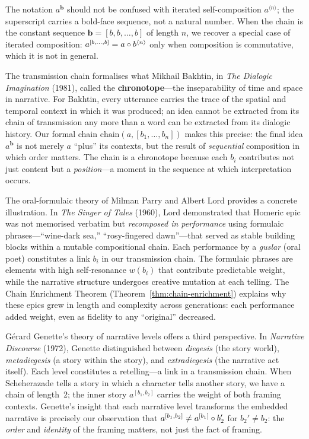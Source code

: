 \begin{remark}
The notation $a^{\mathbf{b}}$ should not be confused with iterated
self-composition $a^{\langle n \rangle}$; the superscript carries a bold-face
sequence, not a natural number.  When the chain is the constant sequence
$\mathbf{b} = [b, b, \ldots, b]$ of length $n$, we recover a special case of
iterated composition:
$a^{[b, \ldots, b]} = a \circ b^{\langle n \rangle}$ only when composition
is commutative, which it is not in general.
\end{remark}

\begin{interpretation}
\label{interp:ch8:bakhtin_chronotope}
The transmission chain formalises what Mikhail Bakhtin, in \emph{The Dialogic
Imagination} (1981), called the \textbf{chronotope}---the inseparability of
time and space in narrative.  For Bakhtin, every utterance carries the trace
of the spatial and temporal context in which it was produced; an idea cannot
be extracted from its chain of transmission any more than a word can be
extracted from its dialogic history.  Our formal chain
$\mathrm{chain}(a, [b_1, \ldots, b_n])$ makes this precise: the final idea
$a^{\mathbf{b}}$ is not merely $a$ ``plus'' its contexts, but the result of
\emph{sequential} composition in which order matters.  The chain is a
chronotope because each $b_i$ contributes not just content but a
\emph{position}---a moment in the sequence at which interpretation occurs.

The oral-formulaic theory of Milman Parry and Albert Lord provides a concrete
illustration.  In \emph{The Singer of Tales} (1960), Lord demonstrated that
Homeric epic was not memorised verbatim but \emph{recomposed in performance}
using formulaic phrases---``wine-dark sea,'' ``rosy-fingered dawn''---that
served as stable building blocks within a mutable compositional chain.  Each
performance by a \emph{guslar} (oral poet) constitutes a link $b_i$ in our
transmission chain.  The formulaic phrases are elements with high
self-resonance $w(b_i)$ that contribute predictable weight, while the
narrative structure undergoes creative mutation at each telling.  The Chain
Enrichment Theorem (Theorem~\ref{thm:chain-enrichment}) explains why these
epics grew in length and complexity across generations: each performance
added weight, even as fidelity to any ``original'' decreased.

G\'erard Genette's theory of narrative levels offers a third perspective.  In
\emph{Narrative Discourse} (1972), Genette distinguished between
\emph{diegesis} (the story world), \emph{metadiegesis} (a story within the
story), and \emph{extradiegesis} (the narrative act itself).  Each level
constitutes a retelling---a link in a transmission chain.  When Scheherazade
tells a story in which a character tells another story, we have a chain of
length~2; the inner story $a^{[b_1, b_2]}$ carries the weight of both
framing contexts.  Genette's insight that each narrative level transforms the
embedded narrative is precisely our observation that
$a^{[b_1, b_2]} \neq a^{[b_1]} \circ b_2'$ for $b_2' \neq b_2$: the
\emph{order} and \emph{identity} of the framing matters, not just the fact
of framing.
\end{interpretation}



